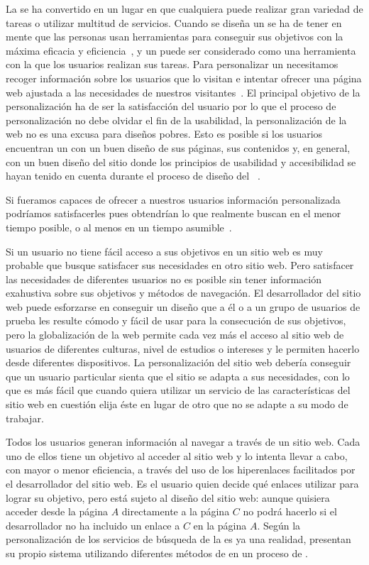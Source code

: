 La \WWW se ha convertido en un lugar en que cualquiera puede realizar gran variedad de tareas o utilizar multitud de servicios. Cuando se diseña un \portalWeb se ha de tener en mente que las personas usan herramientas para conseguir sus objetivos con la máxima eficacia y eficiencia~\citep{ConstantineLockwood_SoftwareForUse_1999}, y un \portalWeb puede ser considerado como una herramienta con la que los usuarios realizan sus tareas. Para personalizar un \portalWeb necesitamos recoger información sobre los usuarios que lo visitan e intentar ofrecer una página web ajustada a las necesidades de nuestros visitantes~\citep{Nielsen_PersonalizationIsOverRated_1998}. El principal objetivo de la personalización ha de ser la satisfacción del usuario por lo que el proceso de personalización no debe olvidar el fin de la usabilidad, la personalización de la web no es una excusa para diseños pobres. Esto es posible si los usuarios encuentran un \portalWeb con un buen diseño de sus páginas, sus contenidos y, en general, con un buen diseño del sitio donde los principios de usabilidad y accesibilidad se hayan tenido en cuenta durante el proceso de diseño del \portalWeb~\citep{Nielsen_DesigningWebUsability_2000}.

Si fueramos capaces de ofrecer a nuestros usuarios información personalizada podríamos satisfacerles pues obtendrían lo que realmente buscan en el menor tiempo posible, o al menos en un tiempo asumible~\citep{DuyneLandayHong_TheDesignOfSites_2002}.

Si un usuario no tiene fácil acceso a sus objetivos en un sitio web es muy probable que busque satisfacer sus necesidades en otro sitio web. Pero satisfacer las necesidades de diferentes usuarios no es posible sin tener información exahustiva sobre sus objetivos y métodos de navegación. El desarrollador del sitio web puede esforzarse en conseguir un diseño que a él o a un grupo de usuarios de prueba les resulte cómodo y fácil de usar para la consecución de sus objetivos, pero la globalización de la web permite cada vez más el acceso al sitio web de usuarios de diferentes culturas, nivel de estudios o intereses y le permiten hacerlo desde diferentes dispositivos. La personalización del sitio web debería conseguir que un usuario particular sienta que el sitio se adapta a sus necesidades, con lo que es más fácil que cuando quiera utilizar un servicio de las características del sitio web en cuestión elija éste en lugar de otro que no se adapte a su modo de trabajar.

Todos los usuarios generan información al navegar a través de un sitio web. Cada uno de ellos tiene un objetivo al acceder al sitio web y lo intenta llevar a cabo, con mayor o menor eficiencia, a través del uso de los hiperenlaces facilitados por el desarrollador del sitio web. Es el usuario quien decide qué enlaces utilizar para lograr su objetivo, pero está sujeto al diseño del sitio web: aunque quisiera acceder desde la página $A$ directamente a la página $C$ no podrá hacerlo si el desarrollador no ha incluido un enlace a $C$ en la página $A$. Según \citet{KimCho_PersonalizedMinin_2007} la personalización de los servicios de búsqueda de la \WWW es ya una realidad, presentan su propio sistema utilizando diferentes métodos de \DM en un proceso de \KDD.

